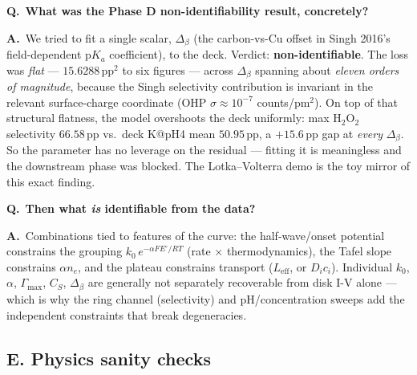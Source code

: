 \documentclass[11pt]{article}
\newcommand{\Eeq}{E^{\circ}}
\newcommand{\CS}{C_{S}}
\newcommand{\Leff}{L_{\mathrm{eff}}}
\newcommand{\Q}[1]{\medskip\par\noindent\textcolor{qcol}{\textbf{Q.}}\ \textbf{#1}\par\nopagebreak\smallskip}
\newcommand{\A}{\noindent\textbf{A.}\ \ignorespaces}
\begin{document}
\Q{What was the Phase D non-identifiability result, concretely?}
\A We tried to fit a single scalar, $\Delta_\beta$ (the carbon-vs-Cu offset
in Singh 2016's field-dependent p$K_a$ coefficient), to the deck. Verdict:
\textbf{non-identifiable}. The loss was \emph{flat} ---
$15.6288\,\mathrm{pp^2}$ to six figures --- across $\Delta_\beta$ spanning
about \emph{eleven orders of magnitude}, because the Singh selectivity
contribution is invariant in the relevant surface-charge coordinate (OHP
$\sigma\approx10^{-7}$ counts/pm$^2$). On top of that structural flatness, the
model overshoots the deck uniformly: max H$_2$O$_2$ selectivity $66.58$\,pp
vs.\ deck K@pH4 mean $50.95$\,pp, a $+15.6$\,pp gap at \emph{every}
$\Delta_\beta$. So the parameter has no leverage on the residual --- fitting
it is meaningless and the downstream phase was blocked. The Lotka--Volterra
demo is the toy mirror of this exact finding.

\Q{Then what \emph{is} identifiable from the data?}
\A Combinations tied to features of the curve: the half-wave/onset potential
constrains the grouping $k_0\,e^{-\alpha F\Eeq/RT}$ (rate $\times$
thermodynamics), the Tafel slope constrains $\alpha n_e$, and the plateau
constrains transport ($\Leff$, or $D_ic_i$). Individual $k_0$, $\alpha$,
$\Gamma_{\max}$, $\CS$, $\Delta_\beta$ are generally not separately
recoverable from disk I-V alone --- which is why the ring channel
(selectivity) and pH/concentration sweeps add the independent constraints
that break degeneracies.

\subsection*{E. Physics sanity checks}
\end{document}
